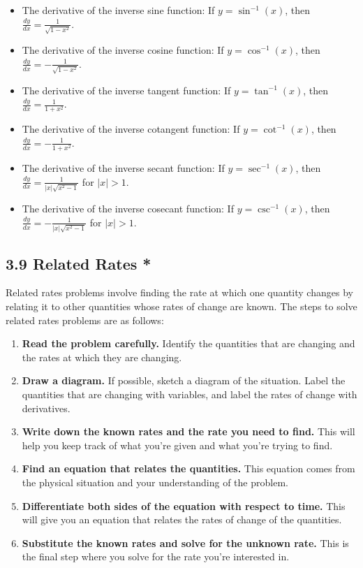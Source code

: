 \documentclass{article}
\begin{document}
\begin{itemize}
\item The derivative of the inverse sine function: If \(y = \sin^{-1}(x)\), then \(\frac{dy}{dx} = \frac{1}{\sqrt{1 - x^2}}\).
\item The derivative of the inverse cosine function: If \(y = \cos^{-1}(x)\), then \(\frac{dy}{dx} = -\frac{1}{\sqrt{1 - x^2}}\).
\item The derivative of the inverse tangent function: If \(y = \tan^{-1}(x)\), then \(\frac{dy}{dx} = \frac{1}{1 + x^2}\).
\item The derivative of the inverse cotangent function: If \(y = \cot^{-1}(x)\), then \(\frac{dy}{dx} = -\frac{1}{1 + x^2}\).
\item The derivative of the inverse secant function: If \(y = \sec^{-1}(x)\), then \(\frac{dy}{dx} = \frac{1}{|x|\sqrt{x^2 - 1}}\) for \(|x| > 1\).
\item The derivative of the inverse cosecant function: If \(y = \csc^{-1}(x)\), then \(\frac{dy}{dx} = -\frac{1}{|x|\sqrt{x^2 - 1}}\) for \(|x| > 1\).
\end{itemize}

\subsection{3.9 Related Rates *}


Related rates problems involve finding the rate at which one quantity changes by relating it to other quantities whose rates of change are known. The steps to solve related rates problems are as follows:

\begin{enumerate}
    \item \textbf{Read the problem carefully.} Identify the quantities that are changing and the rates at which they are changing.
    \item \textbf{Draw a diagram.} If possible, sketch a diagram of the situation. Label the quantities that are changing with variables, and label the rates of change with derivatives.
    \item \textbf{Write down the known rates and the rate you need to find.} This will help you keep track of what you're given and what you're trying to find.
    \item \textbf{Find an equation that relates the quantities.} This equation comes from the physical situation and your understanding of the problem.
    \item \textbf{Differentiate both sides of the equation with respect to time.} This will give you an equation that relates the rates of change of the quantities.
    \item \textbf{Substitute the known rates and solve for the unknown rate.} This is the final step where you solve for the rate you're interested in.
\end{enumerate}
\end{document}
